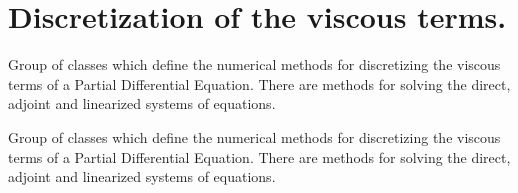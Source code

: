 \hypertarget{group__ViscDiscr}{}\section{Discretization of the viscous terms.}
\label{group__ViscDiscr}


Group of classes which define the numerical methods for discretizing the viscous terms of a Partial Differential Equation. There are methods for solving the direct, adjoint and linearized systems of equations.  


Group of classes which define the numerical methods for discretizing the viscous terms of a Partial Differential Equation. There are methods for solving the direct, adjoint and linearized systems of equations. 

